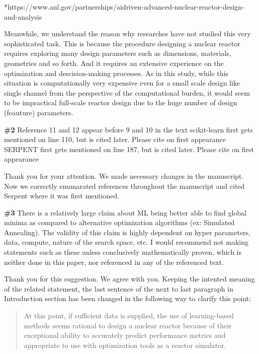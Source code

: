 \documentclass{ar2rc}
\begin{document}
    *https://www.anl.gov/partnerships/aidriven-advanced-nuclear-reactor-design-and-analysis

    Meanwhile, we understand the reason why researches have not studied this    very sophisticated task. This is because the procedure designing a nuclear  reactor requires exploring many design parameters such as dimensions,    materials, geometries and so forth. And it requires an extensive experience on the optimization and descision-making processes. As in this study, while this situation is computationally very expensive even for a small scale    design like single channel from the perspective of the computational burden, it would seem to be impractical full-scale reactor design due to the huge number of design (feauture) parameters.


    \Comment \textbf{\#2} Reference 11 and 12 appear before 9 and 10 in the text scikit-learn
    first gets mentioned on line 110, but is cited later.  Please cite on first
    appearance SERPENT first gets mentioned on line 187, but is cited later.
    Please cite on first appearance


    \Response Thank you for your attention. We made necessary changes in the    manuscript. Now we correctly enumarated references throughout the manuscript and cited Serpent where it was first mentioned.


    \Comment \textbf{\#3} There is a relatively large claim about ML being better able to
    find global minima as compared to alternative optimization algorithms (ex:
    Simulated Annealing). The validity of this claim is highly dependent on
    hyper parameters, data, compute, nature of the search space, etc.  I would
    recommend not making statements such as these unless conclusively
    mathematically proven, which is neither done in this paper, nor referenced
    in any of the referenced text.

    \Response Thank you for this suggestion. We agree with you. Keeping the intented meaning of the related statement, the last sentence of the next to last paragraph in Introduction section has been changed in the following way to clarify this point:\\

    \begin{quote}
        At this point, if sufficient data is supplied, the use of learning-based methods seems rational to design a nuclear reactor because of their exceptional ability to accurately predict performance metrics and appropriate to use with optimization tools as a reactor simulator.
    \end{quote}
\end{document}
